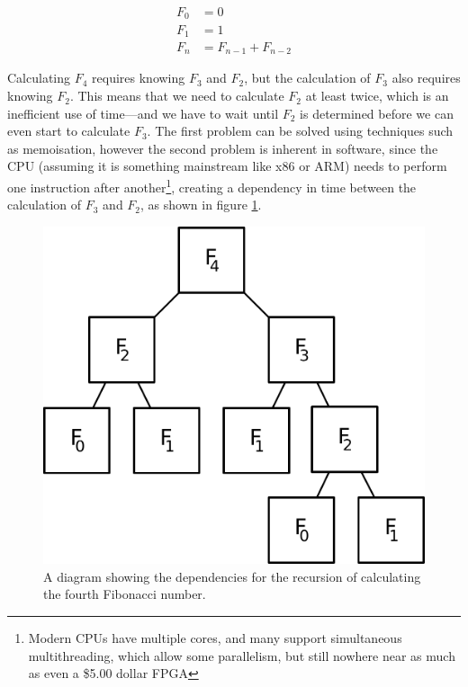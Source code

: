 \documentclass[12pt]{article}
\begin{document}
\begin{align}
	F_0 &= 0 \\
	F_1 &= 1 \\
	F_n &= F_{n-1} + F_{n-2}
\end{align}

\noindent Calculating $F_4$ requires knowing $F_3$ and $F_2$, but the calculation of $F_3$ also requires knowing $F_2$. This means that we need to calculate $F_2$ at least twice, which is an inefficient use of time---and we have to wait until $F_2$ is determined before we can even start to calculate $F_3$. The first problem can be solved using techniques such as memoisation, however the second problem is inherent in software, since the CPU (assuming it is something mainstream like x86 or ARM) needs to perform one instruction after another\footnote{Modern CPUs have multiple cores, and many support simultaneous multithreading, which allow some parallelism, but still nowhere near as much as even a \$5.00 dollar FPGA}, creating a dependency in time between the calculation of $F_3$ and $F_2$, as shown in figure \ref{fib_block}.

\begin{figure}[thp]
	\centering
	
	\includegraphics[width=\textwidth]{fib-block.pdf}
	
	\caption{A diagram showing the dependencies for the recursion of calculating the fourth Fibonacci number.}
	\label{fib_block}
\end{figure}
\end{document}
